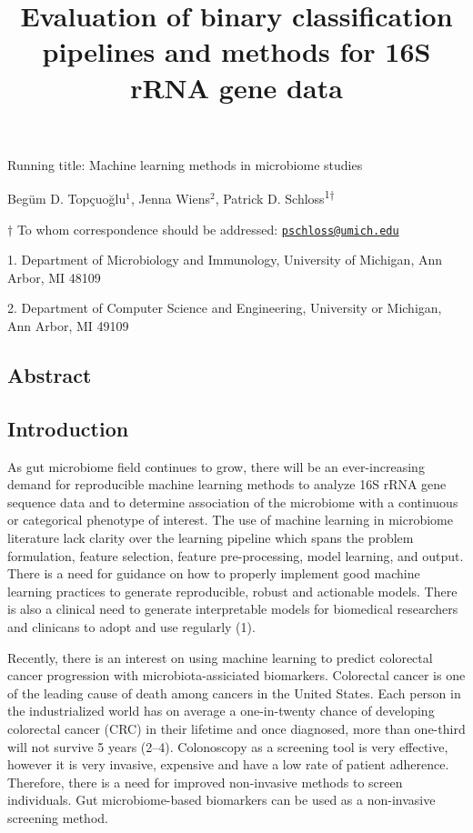 \documentclass[11pt,]{article}
\title{\textbf{Evaluation of binary classification pipelines and methods for
16S rRNA gene data}}
\author{}
\date{}
\begin{document}
\maketitle

\vspace{35mm}

Running title: Machine learning methods in microbiome studies

\vspace{35mm}

Begüm D. Topçuoğlu\({^1}\), Jenna Wiens\({^2}\), Patrick D.
Schloss\textsuperscript{1\(\dagger\)}

\vspace{40mm}

\(\dagger\) To whom correspondence should be addressed:
\href{mailto:pschloss@umich.edu}{\nolinkurl{pschloss@umich.edu}}

1. Department of Microbiology and Immunology, University of Michigan,
Ann Arbor, MI 48109

2. Department of Computer Science and Engineering, University or
Michigan, Ann Arbor, MI 49109

\newpage

\linenumbers

\subsection{Abstract}\label{abstract}

\newpage

\subsection{Introduction}\label{introduction}

As gut microbiome field continues to grow, there will be an
ever-increasing demand for reproducible machine learning methods to
analyze 16S rRNA gene sequence data and to determine association of the
microbiome with a continuous or categorical phenotype of interest. The
use of machine learning in microbiome literature lack clarity over the
learning pipeline which spans the problem formulation, feature
selection, feature pre-processing, model learning, and output. There is
a need for guidance on how to properly implement good machine learning
practices to generate reproducible, robust and actionable models. There
is also a clinical need to generate interpretable models for biomedical
researchers and clinicans to adopt and use regularly (1).

Recently, there is an interest on using machine learning to predict
colorectal cancer progression with microbiota-assiciated biomarkers.
Colorectal cancer is one of the leading cause of death among cancers in
the United States. Each person in the industrialized world has on
average a one-in-twenty chance of developing colorectal cancer (CRC) in
their lifetime and once diagnosed, more than one-third will not survive
5 years (2--4). Colonoscopy as a screening tool is very effective,
however it is very invasive, expensive and have a low rate of patient
adherence. Therefore, there is a need for improved non-invasive methods
to screen individuals. Gut microbiome-based biomarkers can be used as a
non-invasive screening method.
\end{document}
